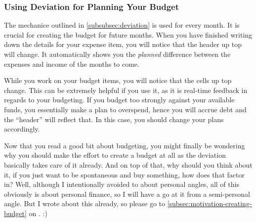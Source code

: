 \subsubsection{Using Deviation for Planning Your Budget}
\label{subsubsec:using-deviation-while-planning-your-budget}

The mechanice outlined in \autoref{subsubsec:deviation} is used for every month.
It is crucial for creating the budget for future months.
When you have finished writing down the details for your expense item, you will notice that the header up top will change.
It automatically shows you the \emph{planned} difference between the expenses and income of the months to come.
\begin{specialnote}
	While you work on your budget items, you will notice that the cells up top change.
	This can be extremely helpful if you use it, as it is real-time feedback in regards to your budgeting.
	If you budget too strongly against your available funds, you essentially make a plan to overspend, hence you will accrue debt and the ``header'' will reflect that.
	In this case, you should change your plans accordingly.
\end{specialnote}

Now that you read a good bit about budgeting, you might finally be wondering why you should make the effort to create a budget at all as the deviation basically takes care of it already.
And on top of that, why should you think about it, if you just want to be spontaneous and buy something, how does that factor in?
Well, although I intentionally avoided to about personal angles, all of this obviously is about personal finance, so I will have a go at it from a semi-personal angle.
But I wrote about this already, so please go to \autoref{subsec:motivation-creating-budget} on . :)
